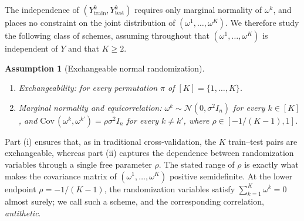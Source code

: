 \documentclass[12pt]{article}
\newtheorem{assumption}{Assumption}[section]
\DeclareMathOperator{\Cov}{Cov}
\def\Cov{{\textrm{Cov}}\,}
\def\calN{\mathcal{N}}
\theoremstyle{general}
\newcommand{\eqd}{\stackrel{d}{=}}
\begin{document}
The independence of $(Y^k_{\mathrm{train}},Y^k_{\mathrm{test}})$ requires only marginal normality of $\omega^k$, and places no constraint on the joint distribution of $(\omega^1,\ldots,\omega^K)$.
We therefore study the following class of schemes, assuming throughout that $(\omega^1,\ldots,\omega^K)$ is independent of $Y$ and that $K\geq2$.

\begin{assumption}[Exchangeable normal randomization]
\label{assump:normal-randomization}
  \begin{enumerate}
    \item[(i)]\label{assump:exch} \emph{Exchangeability:} \sloppy{$(\omega^{\pi(1)}, \ldots, \omega^{\pi(K)}) \eqd (\omega^1, \ldots, \omega^K)$} for every permutation $\pi$ of $[K]=\{1,\ldots,K\}$.
    \item[(ii)]\label{assump:marg} \emph{Marginal normality and equicorrelation:} $\omega^k\sim\calN(0,\sigma^2 I_n)$ for every $k\in[K]$, and $\Cov(\omega^k,\omega^{k'}) = \rho\sigma^2 I_n$ for every $k\neq k'$, where $\rho\in[-1/(K-1),1]$.
  \end{enumerate}
\end{assumption}

Part (i) ensures that, as in traditional cross-validation, the $K$ train--test pairs are exchangeable, whereas part (ii) captures the dependence between randomization variables through a single free parameter $\rho$.
The stated range of $\rho$ is exactly what makes the covariance matrix of $(\omega^1,\ldots,\omega^K)$ positive semidefinite.
At the lower endpoint $\rho=-1/(K-1)$, the randomization variables satisfy $\sum_{k=1}^K\omega^k=0$ almost surely; we call such a scheme, and the corresponding correlation, \emph{antithetic}.
\end{document}
